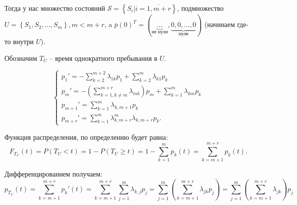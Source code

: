 \begin{ex}
  Тогда у нас множество состояний $\mathcal{S} = \left\{ S_i | i=\overline{1, m+r} \right\} $,
  подмножество $U = \left\{ S_1, S_2, \dots, S_{m} \right\}, m < m+r $, 
  a $\bar{p}(0)^T = ( \underbrace{\dots}_{\text{не нули}},
  \underbrace{0, 0, \dots, 0}_{\text{нули}})$ (начинаем где-то внутри $U$). 

  Обозначим $T_U$ -- время однократного пребывания в $U$.

  \[
    \begin{cases}
      p_1' = - \sum_{k=2}^{m+2} \lambda_{1k} p_1 + \sum_{k=2}^m \lambda_{k 1} p_k  \\
      p_m' = - \left( \sum_{k=1, k\neq m}^{m+r} \lambda_{mk} \right) p_m + \sum_{k=1}^m \lambda_{km} p_k \\
      p_{m+1}' = \sum_{k=1}^m \lambda_{k, m+1} p_k \\
      p_{m+r}' = \sum_{k=1}^m \lambda_{k, m+r}^{m} \lambda_{k, m+r} p_k.
    \end{cases}
  \]

  Функция распределения, по определению будет равна:
  \[
    F_{T_U}(t) = P(T_U < t) = 1 - P(T_U \geqslant t)
    = 1 - \sum_{k=1}^m p_k(t)
    = \sum_{k=m+1}^{m+r} p_k(t).
  \]

  Дифференцированием получаем:
  \[
    p_{T_U}(t) = \sum_{k=m+1}^{m+r} p_k'(t)
    = \sum_{k=m+1}^{m+r} \sum_{j=1}^m \lambda_{k, j} p_j
    = \sum_{j=1}^m \left( \sum_{k=m+1}^{m+r} \lambda_{jk} p_j \right)
    = \sum_{j=1}^m \left( \sum_{k=m+1}^{m+r} \lambda_{jk} \right) p_j
  \]
\end{ex}

